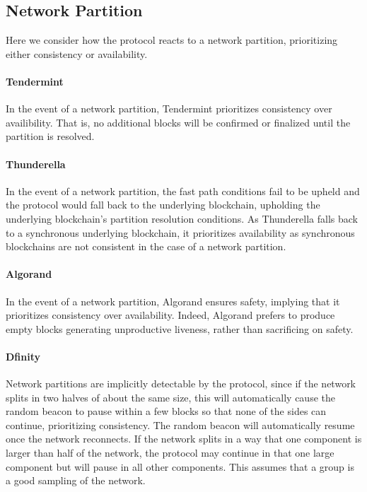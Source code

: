 \documentclass[10pt,journal,compsoc]{IEEEtran}
\begin{document}
\subsection{Network Partition}
Here we consider how the protocol reacts to a network partition, prioritizing either consistency or availability. 

\paragraph{Tendermint} In the event of a network partition, Tendermint prioritizes consistency over availibility. That is, no additional blocks will be confirmed or finalized until the partition is resolved. 

\paragraph{Thunderella} In the event of a network partition, the fast path conditions fail to be upheld and the protocol would fall back to the underlying blockchain, upholding the underlying blockchain's partition resolution conditions. As Thunderella falls back to a synchronous underlying blockchain, it prioritizes availability as synchronous blockchains are not consistent in the case of a network partition.  	

\paragraph{Algorand}
In the event of a network partition, Algorand ensures safety, implying that it prioritizes consistency over availability. Indeed, Algorand prefers to produce empty blocks generating unproductive liveness, rather than sacrificing on safety.

\paragraph{Dfinity} Network partitions are implicitly detectable by the protocol, since if the network splits in two halves of about the same size, this will automatically cause the random beacon to pause within a few blocks so that none of the sides can continue, prioritizing consistency. The random beacon will automatically resume once the network reconnects. If the network splits in a way that one component is larger than half of the network, the protocol may continue in that one large component but will pause in all other components. This assumes that a group is a good sampling of the network. 
\end{document}
